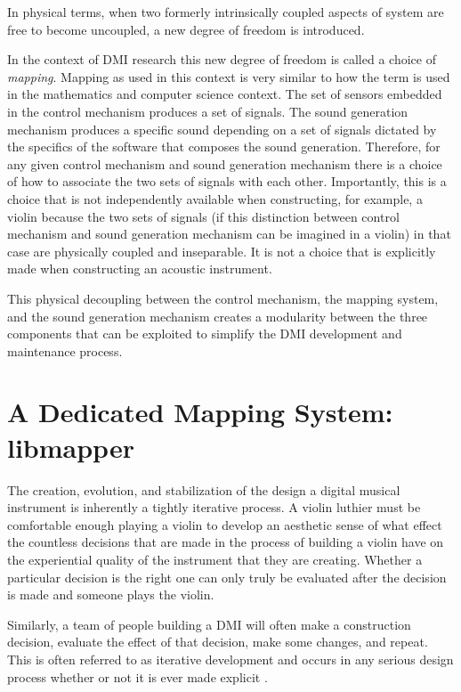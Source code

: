 In physical terms, when two formerly intrinsically coupled aspects of system are free to become uncoupled, a new degree of freedom is introduced.

In the context of DMI research this new degree of freedom is called a choice of \emph{mapping}. Mapping as used in this context is very similar to how the term is used in the mathematics and computer science context. The set of sensors embedded in the control mechanism produces a set of signals. The sound generation mechanism produces a specific sound depending on a set of signals dictated by the specifics of the software that composes the sound generation. Therefore, for any given control mechanism and sound generation mechanism there is a choice of how to associate the two sets of signals with each other. Importantly, this is a choice that is not independently available when constructing, for example, a violin because the two sets of signals (if this distinction between control mechanism and sound generation mechanism can be imagined in a violin) in that case are physically coupled and inseparable. It is not a choice that is explicitly made when constructing an acoustic instrument.

This physical decoupling between the control mechanism, the mapping system, and the sound generation mechanism creates a modularity between the three components that can be exploited to simplify the DMI development and maintenance process.

\section{A Dedicated Mapping System: libmapper}

The creation, evolution, and stabilization of the design a digital musical instrument is inherently a tightly iterative process. A violin luthier must be comfortable enough playing a violin to develop an aesthetic sense of what effect the countless decisions that are made in the process of building a violin have on the experiential quality of the instrument that they are creating. Whether a particular decision is the right one can only truly be evaluated after the decision is made and someone plays the violin. 

Similarly, a team of people building a DMI will often make a construction decision, evaluate the effect of that decision, make some changes, and repeat. This is often referred to as iterative development and occurs in any serious design process whether or not it is ever made explicit \cite{iterative2003}. 

